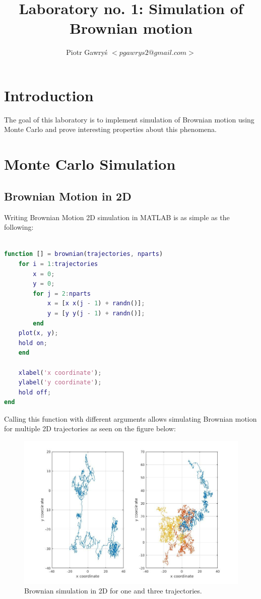 \documentclass[12pt]{article}
\title{Laboratory no. 1: Simulation of Brownian motion}
\author{Piotr Gawry\'s $<pgawrys2@gmail.com>$}
\begin{document}
\maketitle

\section{Introduction}

The goal of this laboratory is to implement simulation of Brownian motion using Monte Carlo and prove interesting properties about this phenomena.

\section{Monte Carlo Simulation}

\subsection{Brownian Motion in 2D}

Writing Brownian Motion 2D simulation in MATLAB is as simple as the following:

\begin{lstlisting}[language=Matlab, caption = {Source code for generating Brownion Motion simulation}]

function [] = brownian(trajectories, nparts)
	for i = 1:trajectories
		x = 0;
		y = 0;
		for j = 2:nparts
			x = [x x(j - 1) + randn()];
			y = [y y(j - 1) + randn()];
		end
	plot(x, y);
	hold on;
	end

	xlabel('x coordinate');
	ylabel('y coordinate');
	hold off;
end

\end{lstlisting}

Calling this function with different arguments allows simulating Brownian motion for multiple 2D trajectories as seen on the figure below:

\begin{figure}[H]
	\centering
	\includegraphics[width=1.0\textwidth]{brownian2d}
	\caption{Brownian simulation in 2D for one and three trajectories.}
\end{figure}
\end{document}
